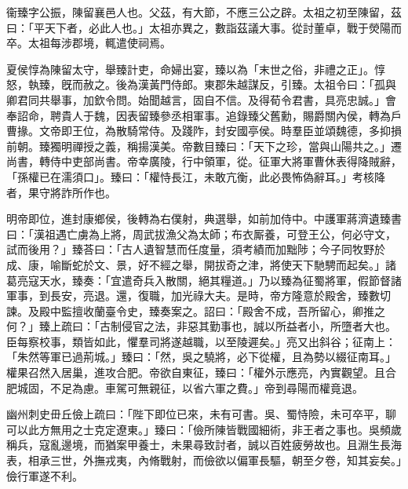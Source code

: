 \begin{pinyinscope}
 
 
 衞臻字公振，陳留襄邑人也。父茲，有大節，不應三公之辟。太祖之初至陳留，茲曰：「平天下者，必此人也。」太祖亦異之，數詣茲議大事。從討董卓，戰于熒陽而卒。太祖每涉郡境，輒遣使祠焉。
 
 
 夏侯惇為陳留太守，舉臻計吏，命婦出宴，臻以為「末世之俗，非禮之正」。惇怒，執臻，旣而赦之。後為漢黃門侍郎。東郡朱越謀反，引臻。太祖令曰：「孤與卿君同共舉事，加欽令問。始聞越言，固自不信。及得荀令君書，具亮忠誠。」會奉詔命，聘貴人于魏，因表留臻參丞相軍事。追錄臻父舊勳，賜爵關內侯，轉為戶曹掾。文帝即王位，為散騎常侍。及踐阼，封安國亭侯。時羣臣並頌魏德，多抑損前朝。臻獨明禪授之義，稱揚漢美。帝數目臻曰：「天下之珍，當與山陽共之。」遷尚書，轉侍中吏部尚書。帝幸廣陵，行中領軍，從。征軍大將軍曹休表得降賊辭，「孫權已在濡須口」。臻曰：「權恃長江，未敢亢衡，此必畏怖偽辭耳。」考核降者，果守將詐所作也。
 
 
 
 
 明帝即位，進封康鄉侯，後轉為右僕射，典選舉，如前加侍中。中護軍蔣濟遺臻書曰：「漢祖遇亡虜為上將，周武拔漁父為太師；布衣厮養，可登王公，何必守文，試而後用？」臻荅曰：「古人遺智慧而任度量，須考績而加黜陟；今子同牧野於成、康，喻斷蛇於文、景，好不經之舉，開拔奇之津，將使天下馳騁而起矣。」諸葛亮寇天水，臻奏：「宜遣奇兵入散關，絕其糧道。」乃以臻為征蜀將軍，假節督諸軍事，到長安，亮退。還，復職，加光祿大夫。是時，帝方隆意於殿舍，臻數切諫。及殿中監擅收蘭臺令史，臻奏案之。詔曰：「殿舍不成，吾所留心，卿推之何？」臻上疏曰：「古制侵官之法，非惡其勤事也，誠以所益者小，所墮者大也。臣每察校事，類皆如此，懼羣司將遂越職，以至陵遲矣。」亮又出斜谷；征南上：「朱然等軍已過荊城。」臻曰：「然，吳之驍將，必下從權，且為勢以綴征南耳。」權果召然入居巢，進攻合肥。帝欲自東征，臻曰：「權外示應亮，內實觀望。且合肥城固，不足為慮。車駕可無親征，以省六軍之費。」帝到尋陽而權竟退。
 
 
 
 
 幽州刺史毌丘儉上疏曰：「陛下即位已來，未有可書。吳、蜀恃險，未可卒平，聊可以此方無用之士克定遼東。」臻曰：「儉所陳皆戰國細術，非王者之事也。吳頻歲稱兵，寇亂邊境，而猶案甲養士，未果尋致討者，誠以百姓疲勞故也。且淵生長海表，相承三世，外撫戎夷，內脩戰射，而儉欲以偏軍長驅，朝至夕卷，知其妄矣。」儉行軍遂不利。
 

\end{pinyinscope}
